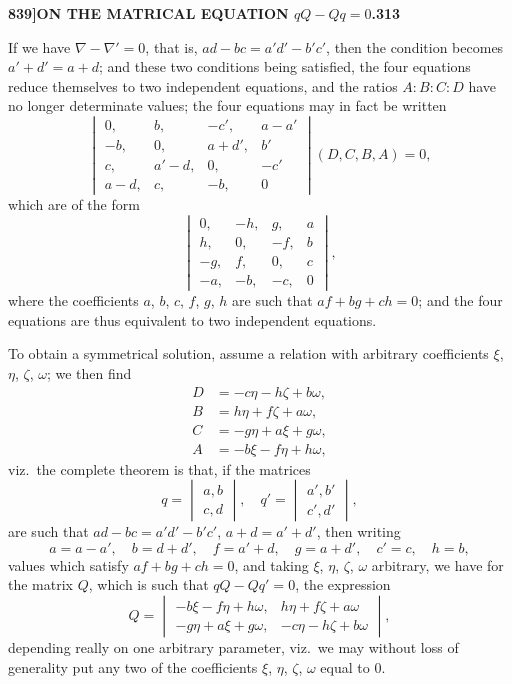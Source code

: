\documentclass[11pt,a4paper]{book}
\begin{document}
\newpage
\setcounter{page}{313}

\noindent\textbf{839]}\hfill\textbf{ON THE MATRICAL EQUATION $qQ - Qq = 0$.}\hfill\textbf{313}

\bigskip

\noindent If we have $\nabla - \nabla' = 0$, that is, $ad - bc = a'd' - b'c'$, then the condition becomes $a' + d' = a + d$; and these two conditions being satisfied, the four equations reduce themselves to two independent equations, and the ratios $A : B : C : D$ have no longer determinate values; the four equations may in fact be written
\[
\begin{vmatrix} 0, & b, & -c', & a - a' \\ -b, & 0, & a + d', & b' \\ c, & a' - d, & 0, & -c' \\ a - d, & c, & -b, & 0 \end{vmatrix} (D, C, B, A) = 0,
\]
which are of the form
\[
\begin{vmatrix} 0, & -h, & g, & a \\ h, & 0, & -f, & b \\ -g, & f, & 0, & c \\ -a, & -b, & -c, & 0 \end{vmatrix},
\]
where the coefficients $a$, $b$, $c$, $f$, $g$, $h$ are such that $af + bg + ch = 0$; and the four equations are thus equivalent to two independent equations.

To obtain a symmetrical solution, assume a relation with arbitrary coefficients $\xi$, $\eta$, $\zeta$, $\omega$; we then find
\begin{align*}
D &= -c\eta - h\zeta + b\omega, \\
B &= h\eta + f\zeta + a\omega, \\
C &= -g\eta + a\xi + g\omega, \\
A &= -b\xi - f\eta + h\omega,
\end{align*}
viz.\ the complete theorem is that, if the matrices
\[
q = \begin{vmatrix} a, b \\ c, d \end{vmatrix}, \quad q' = \begin{vmatrix} a', b' \\ c', d' \end{vmatrix},
\]
are such that $ad - bc = a'd' - b'c'$, $a + d = a' + d'$, then writing
\[
a = a - a', \quad b = d + d', \quad f = a' + d, \quad g = a + d', \quad c' = c, \quad h = b,
\]
values which satisfy $af + bg + ch = 0$, and taking $\xi$, $\eta$, $\zeta$, $\omega$ arbitrary, we have for the matrix $Q$, which is such that $qQ - Qq' = 0$, the expression
\[
Q = \begin{vmatrix} -b\xi - f\eta + h\omega, & h\eta + f\zeta + a\omega \\ -g\eta + a\xi + g\omega, & -c\eta - h\zeta + b\omega \end{vmatrix},
\]
depending really on one arbitrary parameter, viz.\ we may without loss of generality put any two of the coefficients $\xi$, $\eta$, $\zeta$, $\omega$ equal to 0.
\end{document}
